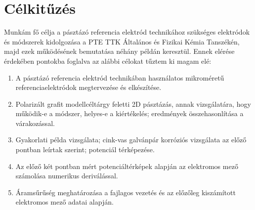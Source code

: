 \chapter{Célkitűzés} \label{celkituzes}
\pagestyle{headings}

Munkám fő célja a pásztázó referencia elektród technikához szükséges elektródok és módszerek kidolgozása a PTE TTK Általános és Fizikai Kémia Tanszékén, majd ezek működésének bemutatása néhány példán keresztül. Ennek elérése érdekében pontokba foglalva az alábbi célokat tűztem ki magam elé:

\begin{enumerate}
\item  A pásztázó referencia elektród technikában használatos mikroméretű referenciaelektródok megtervezése és elkészítése.
\item  Polarizált grafit modellcéltárgy feletti 2D pásztázás, annak vizsgálatára, hogy működik-e a módszer, helyes-e a kiértékelés; eredmények összehasonlítása a várakozással.
\item  Gyakorlati példa vizsgálata; cink-vas galvánpár korróziós vizsgálata az előző pontban leírtak szerint; potenciál térképezése.
\item  Az előző két pontban mért potenciáltérképek alapján az elektromos mező számolása numerikus deriválással.
\item  Áramsűrűség meghatározása a fajlagos vezetés és az előzőleg kiszámított elektromos mező adatai alapján.
\end{enumerate}


